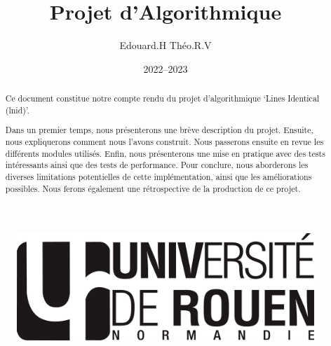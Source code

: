 \documentclass[12pt]{article}
\title{Projet d'Algorithmique}
\author{Edouard.H Théo.R.V}
\date{2022--2023}
\begin{document}
    \begin{figure}
        \includegraphics[scale=0.3, right]{logo-univ-rouen-normandie-noir.png}
    \end{figure}
    
    \maketitle

    \begin{abstract}
        Ce document constitue notre compte rendu du projet d'algorithmique 
        `Lines Identical (lnid)'.
        
        Dans un premier temps, nous présenterons une 
        brève description du projet. Ensuite, nous expliquerons comment nous 
        l'avons construit. Nous passerons ensuite en revue les différents 
        modules utilisés. Enfin, nous présenterons une mise en 
        pratique avec des tests intéressants ainsi que des tests de performance.
        Pour conclure, nous aborderons les diverses limitations potentielles de 
        cette implémentation, ainsi que les améliorations possibles. Nous ferons
         également une rétrospective de la production de ce projet.
    \end{abstract}

    \newpage

    \tableofcontents

    \newpage
\end{document}
